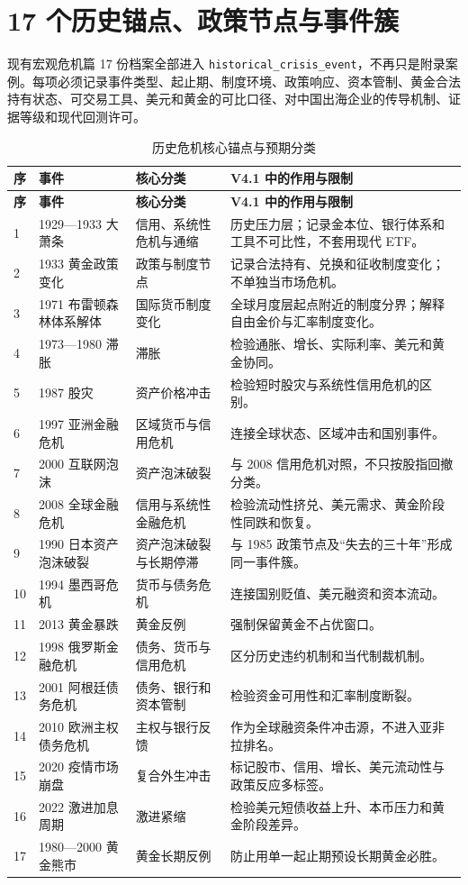 \documentclass[UTF8,fontset=windows,12pt,openany]{ctexbook}
\newcommand{\Field}[1]{{\small\nolinkurl{#1}}}
\begin{document}
\section{17 个历史锚点、政策节点与事件簇}

现有宏观危机篇 17 份档案全部进入 \Field{historical_crisis_event}，不再只是附录案例。每项必须记录事件类型、起止期、制度环境、政策响应、资本管制、黄金合法持有状态、可交易工具、美元和黄金的可比口径、对中国出海企业的传导机制、证据等级和现代回测许可。

\begin{longtable}{p{1.0cm}p{3.3cm}p{3.1cm}p{6.0cm}}
\caption{历史危机核心锚点与预期分类}\label{tab:historical-anchors}\\
\toprule
\textbf{序} & \textbf{事件} & \textbf{核心分类} & \textbf{V4.1 中的作用与限制}\\
\midrule
\endfirsthead
\toprule \textbf{序} & \textbf{事件} & \textbf{核心分类} & \textbf{V4.1 中的作用与限制}\\ \midrule
\endhead
1 & 1929—1933 大萧条 & 信用、系统性危机与通缩 & 历史压力层；记录金本位、银行体系和工具不可比性，不套用现代 ETF。\\
2 & 1933 黄金政策变化 & 政策与制度节点 & 记录合法持有、兑换和征收制度变化；不单独当市场危机。\\
3 & 1971 布雷顿森林体系解体 & 国际货币制度变化 & 全球月度层起点附近的制度分界；解释自由金价与汇率制度变化。\\
4 & 1973—1980 滞胀 & 滞胀 & 检验通胀、增长、实际利率、美元和黄金协同。\\
5 & 1987 股灾 & 资产价格冲击 & 检验短时股灾与系统性信用危机的区别。\\
6 & 1997 亚洲金融危机 & 区域货币与信用危机 & 连接全球状态、区域冲击和国别事件。\\
7 & 2000 互联网泡沫 & 资产泡沫破裂 & 与 2008 信用危机对照，不只按股指回撤分类。\\
8 & 2008 全球金融危机 & 信用与系统性金融危机 & 检验流动性挤兑、美元需求、黄金阶段性同跌和恢复。\\
9 & 1990 日本资产泡沫破裂 & 资产泡沫破裂与长期停滞 & 与 1985 政策节点及“失去的三十年”形成同一事件簇。\\
10 & 1994 墨西哥危机 & 货币与债务危机 & 连接国别贬值、美元融资和资本流动。\\
11 & 2013 黄金暴跌 & 黄金反例 & 强制保留黄金不占优窗口。\\
12 & 1998 俄罗斯金融危机 & 债务、货币与信用危机 & 区分历史违约机制和当代制裁机制。\\
13 & 2001 阿根廷债务危机 & 债务、银行和资本管制 & 检验资金可用性和汇率制度断裂。\\
14 & 2010 欧洲主权债务危机 & 主权与银行反馈 & 作为全球融资条件冲击源，不进入亚非拉排名。\\
15 & 2020 疫情市场崩盘 & 复合外生冲击 & 标记股市、信用、增长、美元流动性与政策反应多标签。\\
16 & 2022 激进加息周期 & 激进紧缩 & 检验美元短债收益上升、本币压力和黄金阶段差异。\\
17 & 1980—2000 黄金熊市 & 黄金长期反例 & 防止用单一起止期预设长期黄金必胜。\\
\bottomrule
\end{longtable}
\end{document}
